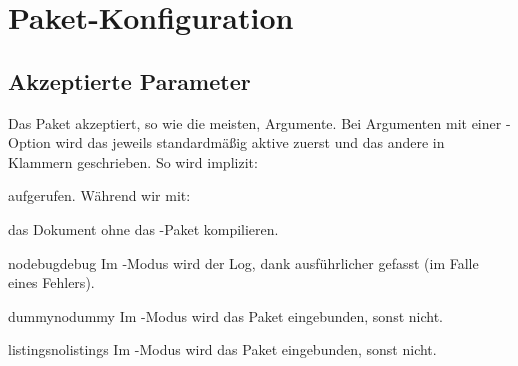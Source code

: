 \documentclass{sopra-base}
\begin{document}
%
%
%
%


\section{Paket-Konfiguration}
    \subsection{Akzeptierte Parameter}
    Das Paket akzeptiert, so wie die meisten, Argumente.
    Bei Argumenten mit einer -Option wird das jeweils standardmäßig aktive zuerst und das andere in Klammern
    geschrieben. So wird implizit:
\begin{plainlatex}
    \usepackage[nodebug,dummy,listings]{sopra-documentation}
\end{plainlatex}
    aufgerufen. Während wir mit:
\begin{plainlatex}
    \usepackage[nolistings]{sopra-documentation}
\end{plainlatex}
    das Dokument ohne das -Paket kompilieren.

    \begin{argument}{nodebug}{debug}
        \label{mrk:debug}Im -Modus wird der Log, dank  ausführlicher gefasst (im Falle eines Fehlers).
    \end{argument}

    \begin{argument}{dummy}{nodummy}
        \label{mrk:nodummy}Im -Modus wird das Paket  eingebunden, sonst nicht.
    \end{argument}

    \begin{argument}{listings}{nolistings}
        \label{mrk:nolistings}Im -Modus wird das Paket  eingebunden, sonst nicht.
    \end{argument}
\end{document}
